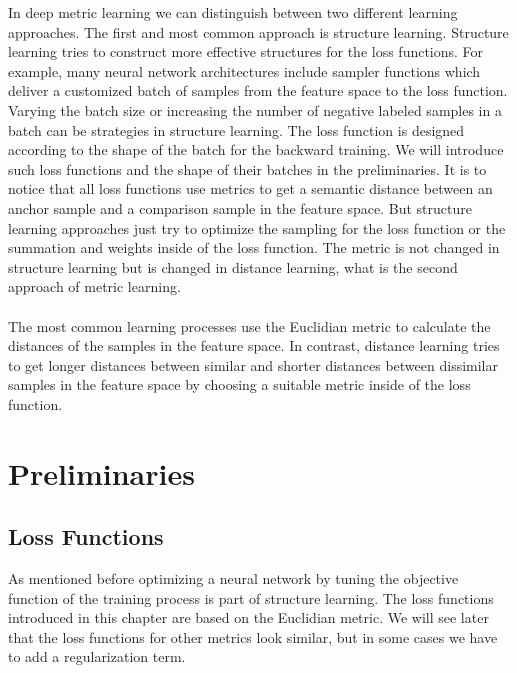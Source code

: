 \documentclass[12pt,paper=a4]{scrartcl}
\theoremstyle{break}
\begin{document}
In deep metric learning we can distinguish between two different learning approaches. The first and most common approach is structure learning. Structure learning tries to construct more effective structures for the loss functions. For example, many neural network architectures include sampler functions which deliver a customized batch of samples from the feature space to the loss function. Varying the batch size or increasing the number of negative labeled samples in a batch can be strategies in structure learning. The loss function is designed according to the shape of the batch for the backward training. We will introduce such loss functions and the shape of their batches in the preliminaries. It is to notice that all loss functions use metrics to get a semantic distance between an anchor sample and a comparison sample in the feature space. But structure learning approaches just try to optimize the sampling for the loss function or the summation and weights inside of the loss function. The metric is not changed in structure learning but is changed in distance learning, what is the second approach of metric learning. \\ \\
The most common learning processes use the Euclidian metric to calculate the distances of the samples in the feature space. In contrast, distance learning tries to get longer distances between similar and shorter distances between dissimilar samples in the feature space by choosing a suitable metric inside of the loss function.\cite{source1}
\section{Preliminaries}
\subsection{Loss Functions}
As mentioned before optimizing a neural network by tuning the objective function of the training process is part of structure learning. The loss functions introduced in this chapter are based on the Euclidian metric. We will see later that the loss functions for other metrics look similar, but in some cases we have to add a regularization term.
\end{document}

